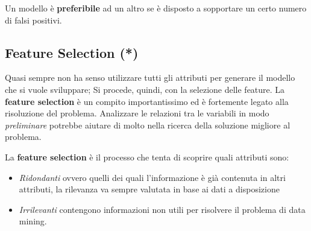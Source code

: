 Un modello è \textbf{preferibile} ad un altro se è disposto a sopportare un certo numero di falsi positivi.


\subsection{Feature Selection (*)}
Quasi sempre non ha senso utilizzare tutti gli attributi per generare il modello che si vuole sviluppare; Si procede, quindi,  con la selezione delle feature.
La \textbf{feature selection} è un compito importantissimo ed è fortemente legato alla risoluzione del problema. Analizzare le relazioni tra le variabili in modo \textit{preliminare} potrebbe aiutare di molto nella ricerca della soluzione migliore al problema. 
\begin{defn}
La \textbf{feature selection} è il processo che tenta di scoprire quali attributi sono:
\begin{itemize}
	\item \textit{Ridondanti} ovvero quelli dei quali l'informazione è già contenuta in altri attributi, la rilevanza va sempre valutata in base ai dati a disposizione
	\item \textit{Irrilevanti} contengono informazioni non utili per risolvere il problema di data mining.
\end{itemize}
\end{defn}

